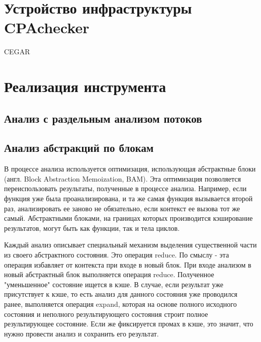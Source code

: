 \section{Устройство инфраструктуры CPAchecker}
\label{sect_impl_cpachecker}

CEGAR

\section{Реализация инструмента}
\label{sect_impl_overview}

\subsection{Анализ с раздельным анализом потоков}
\label{subsect_impl_tm}

\subsection{Анализ абстракций по блокам}
\label{subsect_impl_bam}

В процессе анализа используется оптимизация, использующая абстрактные блоки (англ. Block Abstraction Memoization, BAM). 
Эта оптимизация позволяется переиспользовать результаты, полученные в процессе анализа.
Например, если функция уже была проанализирована, и та же самая функция вызывается второй раз, анализировать ее заново не обязательно, если контекст ее вызова тот же самый.
Абстрактными блоками, на границах которых производится кэширование результатов, могут быть как функции, так и тела циклов. 

Каждый анализ описывает специальный механизм выделения существенной части из своего абстрактного состояния. Это операция reduce. 
По смыслу - эта операция избавляет от контекста при входе в новый блок.
При входе анализом в новый абстрактный блок выполняется операция reduce. Полученное "уменьшенное" состояние ищется в кэше.
В случае, если результат уже присутствует к кэше, то есть анализ для данного состояния уже проводился ранее, выполняется операция expand, которая на основе полного исходного состояния и неполного результирующего состояния строит полное результирующее состояние. 
Если же фиксируется промах в кэше, это значит, что нужно провести анализ и сохранить его результат. 


